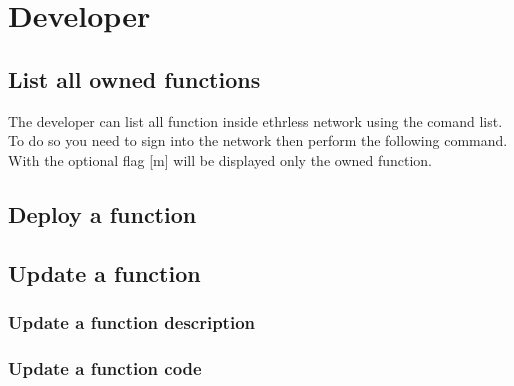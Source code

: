 \section{Developer}

\subsection{List all owned functions}
The developer can list all function inside ethrless network using the comand list. To do so you need to sign into the network then perform the following command.
\newline With the optional flag [m] will be displayed only the owned function.

\subsection{Deploy a function}

\subsection{Update a function}

\subsubsection{Update a function description}

\subsubsection{Update a function code}
